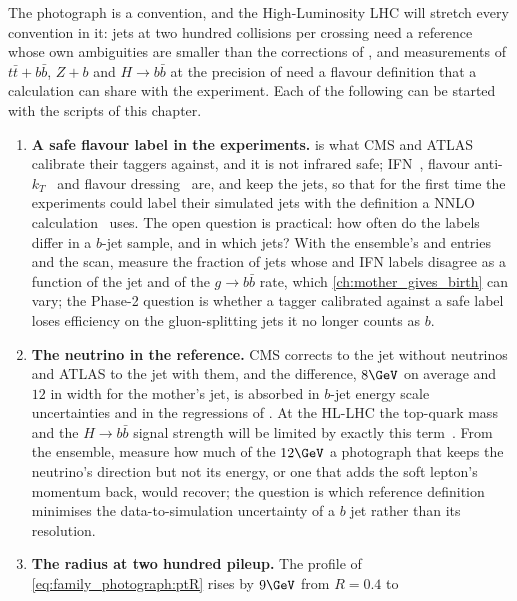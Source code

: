 The photograph is a convention, and the High-Luminosity LHC will stretch
every convention in it: jets at two hundred collisions per crossing need
a reference whose own ambiguities are smaller than the corrections of
, and measurements of
$t\bar t+b\bar b$, $Z+b$ and $H\to b\bar b$ at the precision of
\cite{Azzi:2019yne} need a flavour definition that a calculation can
share with the experiment. Each of the following can be started with
the scripts of this chapter.
\begin{enumerate}
  \item \textbf{A safe flavour label in the experiments.} \hadflav is
    what CMS and ATLAS calibrate their taggers against, and it is not
    infrared safe; IFN~\cite{Caletti:2022glq}, flavour
    anti-$k_T$~\cite{Czakon:2022khx} and flavour dressing~\cite{Gauld:2022lem}
    are, and keep the \antikt jets, so that for the first time the
    experiments could label their simulated jets with the definition a
    NNLO calculation~\cite{Gauld:2020deh,Caletti:2022hnc} uses. The open
    question is practical: how often do the labels differ in a $b$-jet
    sample, and in which jets? With the ensemble's  and
     entries and the  scan, measure the
    fraction of jets whose \hadflav and IFN labels disagree as a function
    of the jet \pt and of the $g\to b\bar b$ rate, which
    \cref{ch:mother_gives_birth} can vary; the Phase-2 question is
    whether a tagger calibrated against a safe label loses efficiency on
    the gluon-splitting jets it no longer counts as $b$.
  \item \textbf{The neutrino in the reference.} CMS corrects to the jet
    without neutrinos and ATLAS to the jet with them, and the
    difference, $8\GeV$ on average and $12$ in width for the mother's
    jet, is absorbed in $b$-jet energy scale uncertainties and in the
    regressions of \cite{CMS:2019uxx}. At the HL-LHC the top-quark mass
    and the $H\to b\bar b$ signal strength will be limited by exactly
    this term~\cite{Azzi:2019yne}. From the ensemble, measure how much of
    the $12\GeV$ a photograph that keeps the neutrino's direction but
    not its energy, or one that adds the soft lepton's momentum back,
    would recover; the question is which reference definition minimises
    the data-to-simulation uncertainty of a $b$ jet rather than its
    resolution.
  \item \textbf{The radius at two hundred pileup.} The profile of
    \cref{eq:family_photograph:ptR} rises by $9\GeV$ from $R=0.4$ to

\end{enumerate}
